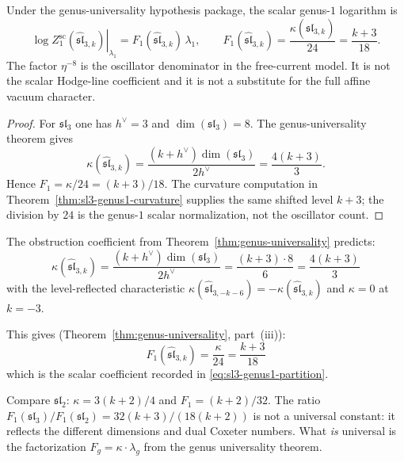 \begin{proposition}
\label{prop:sl3-genus1-partition}
Under the genus-universality hypothesis package, the scalar genus-$1$
logarithm is
\begin{equation}\label{eq:sl3-genus1-partition}
\left.\log Z_1^{\mathrm{sc}}(\widehat{\mathfrak{sl}}_{3,k})\right|_{\lambda_1}
= F_1(\widehat{\mathfrak{sl}}_{3,k})\,\lambda_1,
\qquad
F_1(\widehat{\mathfrak{sl}}_{3,k})
=\frac{\kappa(\widehat{\mathfrak{sl}}_{3,k})}{24}
=\frac{k+3}{18}.
\end{equation}
The factor $\eta^{-8}$ is the oscillator denominator in the free-current
model. It is not the scalar Hodge-line coefficient and it is not a
substitute for the full affine vacuum character.
\end{proposition}

\begin{proof}
For $\mathfrak{sl}_3$ one has $h^\vee=3$ and
$\dim(\mathfrak{sl}_3)=8$. The genus-universality theorem gives
\[
\kappa(\widehat{\mathfrak{sl}}_{3,k})
=\frac{(k+h^\vee)\dim(\mathfrak{sl}_3)}{2h^\vee}
=\frac{4(k+3)}3 .
\]
Hence $F_1=\kappa/24=(k+3)/18$. The curvature computation in
Theorem~\ref{thm:sl3-genus1-curvature} supplies the same shifted level
$k+3$; the division by $24$ is the genus-$1$ scalar normalization, not
the oscillator count.
\end{proof}

\begin{remark}\label{rem:sl3-universality}
The obstruction coefficient from Theorem~\ref{thm:genus-universality} predicts:
\begin{equation}
\kappa(\widehat{\mathfrak{sl}}_{3,k}) = \frac{(k+h^\vee)\dim(\mathfrak{sl}_3)}{2h^\vee} = \frac{(k+3) \cdot 8}{6} = \frac{4(k+3)}{3}
\end{equation}
with the level-reflected characteristic
\(\kappa(\widehat{\mathfrak{sl}}_{3,-k-6})
= -\kappa(\widehat{\mathfrak{sl}}_{3,k})\) and $\kappa = 0$ at
$k = -3$.

This gives (Theorem~\ref{thm:genus-universality}, part~(iii)):
\begin{equation}
F_1(\widehat{\mathfrak{sl}}_{3,k}) = \frac{\kappa}{24} = \frac{k+3}{18}
\end{equation}
which is the scalar coefficient recorded in
\eqref{eq:sl3-genus1-partition}.

Compare $\mathfrak{sl}_2$: $\kappa = 3(k+2)/4$ and $F_1 = (k+2)/32$. The ratio $F_1(\mathfrak{sl}_3)/F_1(\mathfrak{sl}_2) = 32(k+3)/(18(k+2))$ is not a universal constant: it reflects the different dimensions and dual Coxeter numbers. What \emph{is} universal is the factorization $F_g = \kappa \cdot \lambda_g$ from the genus universality theorem.
\end{remark}


